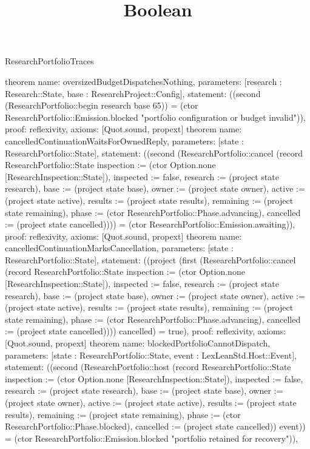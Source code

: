 \begin{lexlean}{ResearchPortfolioTraces}
\title{Boolean}
\begin{semanticmodule}
theorem{
 name: oversizedBudgetDispatchesNothing,
 parameters: [research : Research::State, base : ResearchProject::Config],
 statement: ((second (ResearchPortfolio::begin research base 65)) = (ctor ResearchPortfolio::Emission.blocked "portfolio configuration or budget invalid")),
 proof: reflexivity{},
 axioms: [Quot.sound, propext]
}
theorem{
 name: cancelledContinuationWaitsForOwnedReply,
 parameters: [state : ResearchPortfolio::State],
 statement: ((second (ResearchPortfolio::cancel (record ResearchPortfolio::State {inspection := (ctor Option.none [ResearchInspection::State]), inspected := false, research := (project state research), base := (project state base), owner := (project state owner), active := (project state active), results := (project state results), remaining := (project state remaining), phase := (ctor ResearchPortfolio::Phase.advancing), cancelled := (project state cancelled)}))) = (ctor ResearchPortfolio::Emission.awaiting)),
 proof: reflexivity{},
 axioms: [Quot.sound, propext]
}
theorem{
 name: cancelledContinuationMarksCancellation,
 parameters: [state : ResearchPortfolio::State],
 statement: ((project (first (ResearchPortfolio::cancel (record ResearchPortfolio::State {inspection := (ctor Option.none [ResearchInspection::State]), inspected := false, research := (project state research), base := (project state base), owner := (project state owner), active := (project state active), results := (project state results), remaining := (project state remaining), phase := (ctor ResearchPortfolio::Phase.advancing), cancelled := (project state cancelled)}))) cancelled) = true),
 proof: reflexivity{},
 axioms: [Quot.sound, propext]
}
theorem{
 name: blockedPortfolioCannotDispatch,
 parameters: [state : ResearchPortfolio::State, event : LexLeanStd.Host::Event],
 statement: ((second (ResearchPortfolio::host (record ResearchPortfolio::State {inspection := (ctor Option.none [ResearchInspection::State]), inspected := false, research := (project state research), base := (project state base), owner := (project state owner), active := (project state active), results := (project state results), remaining := (project state remaining), phase := (ctor ResearchPortfolio::Phase.blocked), cancelled := (project state cancelled)}) event)) = (ctor ResearchPortfolio::Emission.blocked "portfolio retained for recovery")),
}
\end{semanticmodule}
\end{lexlean}
